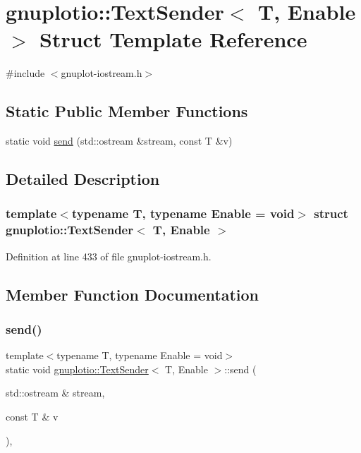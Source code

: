 \hypertarget{structgnuplotio_1_1_text_sender}{}\section{gnuplotio\+:\+:Text\+Sender$<$ T, Enable $>$ Struct Template Reference}
\label{structgnuplotio_1_1_text_sender}


{\ttfamily \#include $<$gnuplot-\/iostream.\+h$>$}

\subsection*{Static Public Member Functions}
\begin{DoxyCompactItemize}
\item 
static void \hyperlink{structgnuplotio_1_1_text_sender_a03b58292dc75a4137d30ad7fffd762c6}{send} (std\+::ostream \&stream, const T \&v)
\end{DoxyCompactItemize}


\subsection{Detailed Description}
\subsubsection*{template$<$typename T, typename Enable = void$>$\newline
struct gnuplotio\+::\+Text\+Sender$<$ T, Enable $>$}



Definition at line 433 of file gnuplot-\/iostream.\+h.



\subsection{Member Function Documentation}
\mbox{\label{structgnuplotio_1_1_text_sender_a03b58292dc75a4137d30ad7fffd762c6}} 
\subsubsection{\texorpdfstring{send()}{send()}}
{\footnotesize\ttfamily template$<$typename T, typename Enable = void$>$ \\
static void \hyperlink{structgnuplotio_1_1_text_sender}{gnuplotio\+::\+Text\+Sender}$<$ T, Enable $>$\+::send (\begin{DoxyParamCaption}\item[{std\+::ostream \&}]{stream,  }\item[{const T \&}]{v }\end{DoxyParamCaption})\hspace{0.3cm}{\ttfamily [inline]}, {\ttfamily [static]}}



